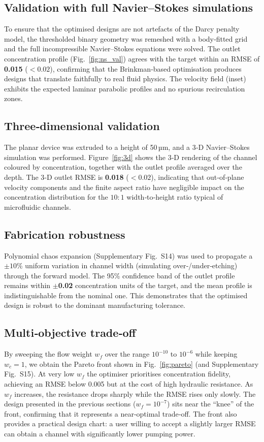 \documentclass[12pt]{article}
\begin{document}
\subsection{Validation with full Navier–Stokes simulations}
To ensure that the optimised designs are not artefacts of the Darcy penalty model, the thresholded binary geometry was remeshed with a body‑fitted grid and the full incompressible Navier–Stokes equations were solved. The outlet concentration profile (Fig.~\ref{fig:ns_val}) agrees with the target within an RMSE of \textbf{0.015} ($< 0.02$), confirming that the Brinkman‑based optimisation produces designs that translate faithfully to real fluid physics. The velocity field (inset) exhibits the expected laminar parabolic profiles and no spurious recirculation zones.

\subsection{Three‑dimensional validation}
The planar device was extruded to a height of 50 µm, and a 3‑D Navier–Stokes simulation was performed. Figure~\ref{fig:3d} shows the 3‑D rendering of the channel coloured by concentration, together with the outlet profile averaged over the depth. The 3‑D outlet RMSE is \textbf{0.018} ($< 0.02$), indicating that out‑of‑plane velocity components and the finite aspect ratio have negligible impact on the concentration distribution for the $10{:}1$ width‑to‑height ratio typical of microfluidic channels.

\subsection{Fabrication robustness}
Polynomial chaos expansion (Supplementary Fig.~S14) was used to propagate a $\pm 10$\% uniform variation in channel width (simulating over‑/under‑etching) through the forward model. The 95\% confidence band of the outlet profile remains within $\pm$\textbf{0.02} concentration units of the target, and the mean profile is indistinguishable from the nominal one. This demonstrates that the optimised design is robust to the dominant manufacturing tolerance.

\subsection{Multi‑objective trade‑off}
By sweeping the flow weight $w_f$ over the range $10^{-10}$ to $10^{-6}$ while keeping $w_c = 1$, we obtain the Pareto front shown in Fig.~\ref{fig:pareto} (and Supplementary Fig.~S15). At very low $w_f$ the optimiser prioritises concentration fidelity, achieving an RMSE below 0.005 but at the cost of high hydraulic resistance. As $w_f$ increases, the resistance drops sharply while the RMSE rises only slowly. The design presented in the previous sections ($w_f = 10^{-7}$) sits near the “knee” of the front, confirming that it represents a near‑optimal trade‑off. The front also provides a practical design chart: a user willing to accept a slightly larger RMSE can obtain a channel with significantly lower pumping power.
\end{document}
